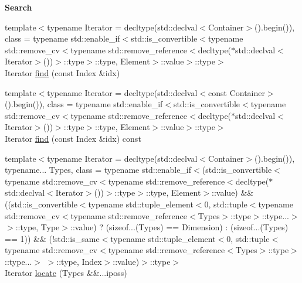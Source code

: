 \begin{Indent}{\bf Search}\par
\begin{DoxyCompactItemize}
\item 
{\footnotesize template$<$typename Iterator  = decltype(std\-::declval$<$\-Container$>$().\-begin()), class  = typename std\-::enable\-\_\-if$<$std\-::is\-\_\-convertible$<$typename std\-::remove\-\_\-cv$<$typename std\-::remove\-\_\-reference$<$decltype($\ast$std\-::declval$<$\-Iterator$>$())$>$\-::type$>$\-::type, Element$>$\-::value$>$\-::type$>$ }\\Iterator \hyperlink{exceptionmagrathea_1_1SimpleHyperOctree_aef32efb6ad9bb1a1f0d9feb80adad5bf}{find} (const Index \&idx)
\item 
{\footnotesize template$<$typename Iterator  = decltype(std\-::declval$<$const Container$>$().\-begin()), class  = typename std\-::enable\-\_\-if$<$std\-::is\-\_\-convertible$<$typename std\-::remove\-\_\-cv$<$typename std\-::remove\-\_\-reference$<$decltype($\ast$std\-::declval$<$\-Iterator$>$())$>$\-::type$>$\-::type, Element$>$\-::value$>$\-::type$>$ }\\Iterator \hyperlink{exceptionmagrathea_1_1SimpleHyperOctree_a4a6f904c4455f49ca831bb4fbb24876d}{find} (const Index \&idx) const 
\item 
{\footnotesize template$<$typename Iterator  = decltype(std\-::declval$<$\-Container$>$().\-begin()), typename... Types, class  = typename std\-::enable\-\_\-if$<$(std\-::is\-\_\-convertible$<$typename std\-::remove\-\_\-cv$<$typename std\-::remove\-\_\-reference$<$decltype($\ast$std\-::declval$<$\-Iterator$>$())$>$\-::type$>$\-::type, Element$>$\-::value) \&\& ((std\-::is\-\_\-convertible$<$typename std\-::tuple\-\_\-element$<$0, std\-::tuple$<$typename std\-::remove\-\_\-cv$<$typename std\-::remove\-\_\-reference$<$\-Types$>$\-::type$>$\-::type...$>$ $>$\-::type, Type$>$\-::value) ? (sizeof...(\-Types) == Dimension) \-: (sizeof...(\-Types) == 1)) \&\& (!std\-::is\-\_\-same$<$typename std\-::tuple\-\_\-element$<$0, std\-::tuple$<$typename std\-::remove\-\_\-cv$<$typename std\-::remove\-\_\-reference$<$\-Types$>$\-::type$>$\-::type...$>$ $>$\-::type, Index$>$\-::value)$>$\-::type$>$ }\\Iterator \hyperlink{exceptionmagrathea_1_1SimpleHyperOctree_a415e4e9e542e3598cc99abcd2870a055}{locate} (Types \&\&...iposs)
\item 

\end{DoxyCompactItemize}
\end{Indent}
